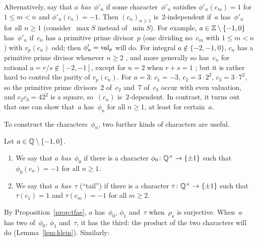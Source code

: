 \begin{remark}
  \label{rem:ppd}
  Alternatively, say that \emph{$a$ has~$\phi'_n$} if some character~$\phi'_n$ satisfies
  $\phi'_n(c_m) = 1$ for $1 \le m < n$ and $\phi'_n(c_n) = -1$. Then $(c_n)_{n \ge 1}$
  is~$2$-independent if~$a$ has~$\phi'_n$ for all $n \ge 1$ (consider~$\max S$ instead
  of~$\min S$). For example, $a \in \mathbb{Z} \setminus \{-1, 0\}$ has~$\phi'_n$ if~$c_n$ has a primitive
  prime divisor~$p$ (one dividing no~$c_m$ with $1 \le m < n$) with $v_p(c_n)$ odd; then
  $\phi'_n = \operatorname{val}_p$ will do. For integral $a \notin \{-2, -1, 0\}$, $c_n$ has a primitive prime
  divisor whenever $n \ge 2$ \cite{rice, doerksen-haensch}, and more generally so has~$c_n$ for
  rational $a = r/s \notin [-2, -1]$, except for $n = 2$ when $r + s = 1$ \cite{krieger}; but it
  is rather hard to control the parity of $v_p(c_n)$. For $a = 3$: $c_1 = -3$,
  $c_2 = 3 \cdot 2^2$, $c_3 = 3 \cdot 7^2$, so the primitive prime divisors~$2$ of~$c_2$ and~$7$
  of~$c_3$ occur with even valuation, and $c_2 c_3 = 42^2$ is a square, so~$(c_n)$
  is~$2$-dependent. In contrast, it turns out that one can show that~$a$ has~$\phi_n$ for all
  $n \ge 1$, at least for certain~$a$.
\end{remark}

To construct the characters~$\phi_n$, two further kinds of characters are useful.

\begin{definition}
  \label{def:phi0tau}
  \leanok
  Let $a \in \mathbb{Q} \setminus \{-1, 0\}$.
  \begin{enumerate}
    \item We say that \emph{$a$ has~$\phi_0$} if there is a character
          $\phi_0 \colon \mathbb{Q}^\times \to \{\pm 1\}$ such that $\phi_0(c_n) = -1$ for all $n \ge 1$.
    \item We say that \emph{$a$ has~$\tau$} (``tail'') if there is a character
          $\tau \colon \mathbb{Q}^\times \to \{\pm 1\}$ such that $\tau(c_1) = 1$ and $\tau(c_m) = -1$ for
          all $m \ge 2$.
  \end{enumerate}
\end{definition}

By Proposition~\ref{prop:tfae}, $a$ has~$\phi_0$, $\phi_1$ and~$\tau$ when~$\rho_a$ is surjective.
When~$a$ has two of~$\phi_0$, $\phi_1$ and~$\tau$, it has the third: the product of the two
characters will do (Lemma~\ref{lem:klein}). Similarly:

